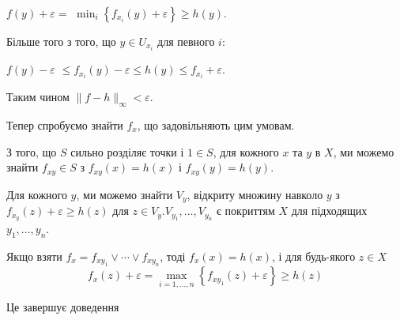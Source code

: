 $f(y)+\varepsilon=$ $\min _i\left\{f_{x_i}(y)+\varepsilon\right\} 
\geq h(y)$. 


Більше того з того, що $y \in U_{x_i}$ для певного $i$:


$f(y)-\varepsilon$ $\leq f_{x_i}(y)-\varepsilon \leq h(y) \le 
f_{x_i} + \varepsilon$. 


Таким чином $\|f-h\|_{\infty}<\varepsilon$.

Тепер спробуємо знайти $f_x$, що задовільняють цим умовам. 


З того, що $S$ сильно розділяє точки і $1 \in S$, 
для кожного $x$ та $y$ в $X$, ми можемо знайти $f_{x y} \in S$ 
з $f_{x y}(x)= h(x)$ і $f_{x y}(y)=h(y)$. 


Для кожного $y$, ми можемо знайти $V_y$, відкриту множину навколо $y$ 
з $f_{\dot{x}_y}(z)+\varepsilon \geq h(z)$ 
для $z \in V_y . V_{y_1}, \ldots, V_{y_n}$ є покриттям $X$ 
для підходящих $y_1, \ldots, y_n$. 


Якщо взяти $f_x=f_{x y_1} \vee \cdots \vee f_{x y_n}$, 
тоді $f_x(x)=h(x)$, і для будь-якого $z \in X$
$$
f_x(z)+\varepsilon=\max _{i=1, \ldots, n}\left\{f_{x y_1}(z)+\varepsilon\right\} \geq h(z)
$$


Це завершує доведення